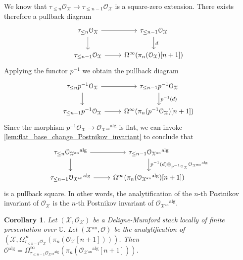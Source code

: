 \documentclass[12pt,a4paper,reqno]{amsart}
\theoremstyle{plain}
\newtheorem{cor}[thm]{Corollary}
\theoremstyle{definition}
\theoremstyle{remark}
\numberwithin{equation}{section}
\begin{document}
We know that $\tau_{\le n} {\mathcal O}_{\mathcal X} \to \tau_{\le n - 1} {\mathcal O}_{\mathcal X}$ is a square-zero extension.
There exists therefore a pullback diagram
\[ \begin{tikzcd}
	\tau_{\le n} {\mathcal O}_{\mathcal X} \arrow{r} \arrow{d} & \tau_{\le n - 1} {\mathcal O}_{\mathcal X} \arrow{d}{d} \\
	\tau_{\le n - 1} {\mathcal O}_{\mathcal X} \arrow{r} & \Omega^\infty(\pi_n({\mathcal O}_{\mathcal X})[n+1])
\end{tikzcd} \]
Applying the functor $p{^{-1}}$ we obtain the pullback diagram
\[ \begin{tikzcd}
	\tau_{\le n} p{^{-1}} {\mathcal O}_{\mathcal X} \arrow{r} \arrow{d} & \tau_{\le n - 1} p{^{-1}} {\mathcal O}_{\mathcal X} \arrow{d}{p{^{-1}}(d)} \\
	\tau_{\le n - 1} p{^{-1}} {\mathcal O}_{\mathcal X} \arrow{r} & \Omega^\infty(\pi_n (p{^{-1}} {\mathcal O}_{\mathcal X} )[n+1])
\end{tikzcd} \]
Since the morphism $p{^{-1}} {\mathcal O}_{\mathcal X} \to {\mathcal O}_{{\mathcal X}{^\mathrm{an}}}{^\mathrm{alg}}$ is flat, we can invoke \cref{lem:flat_base_change_Postnikov_invariant} to conclude that
\[ \begin{tikzcd}
	\tau_{\le n} {\mathcal O}_{{\mathcal X}{^\mathrm{an}}}{^\mathrm{alg}} \arrow{r} \arrow{d} & \tau_{\le n - 1} {\mathcal O}_{{\mathcal X}{^\mathrm{an}}}{^\mathrm{alg}} \arrow{d}{p{^{-1}}(d) \otimes_{p{^{-1}} {\mathcal O}_{\mathcal X}} {\mathcal O}_{{\mathcal X}{^\mathrm{an}}}{^\mathrm{alg}}} \\
	\tau_{\le n - 1} {\mathcal O}_{{\mathcal X}{^\mathrm{an}}}{^\mathrm{alg}} \arrow{r} & \Omega^\infty(\pi_n({\mathcal O}_{{\mathcal X}{^\mathrm{an}}}{^\mathrm{alg}})[n+1])
\end{tikzcd} \]
is a pullback square.
In other words, the analytification of the $n$-th Postnikov invariant of ${\mathcal O}_{\mathcal X}$ is the $n$-th Postnikov invariant of ${\mathcal O}_{{\mathcal X}{^\mathrm{an}}}{^\mathrm{alg}}$.
	
\begin{cor} \label{cor:description_analytification}
	Let $({\mathcal X}, {\mathcal O}_{\mathcal X})$ be a {Deligne-Mumford\xspace} stack locally of finite presentation over $\mathbb C$.
	Let $({\mathcal X}{^\mathrm{an}}, {\mathcal O})$ be the analytification of $({\mathcal X}, \Omega^\infty_{\tau_{\le n - 1} {\mathcal O}_{\mathcal X}}(\pi_n({\mathcal O}_{\mathcal X}[n+1])))$.
	Then ${\mathcal O}{^\mathrm{alg}} = \Omega^\infty_{\tau_{\le n - 1} {\mathcal O}_{{\mathcal X}{^\mathrm{an}}}{^\mathrm{alg}}}(\pi_n({\mathcal O}_{{\mathcal X}{^\mathrm{an}}}{^\mathrm{alg}}[n+1]))$.
\end{cor}
	
\end{document}
